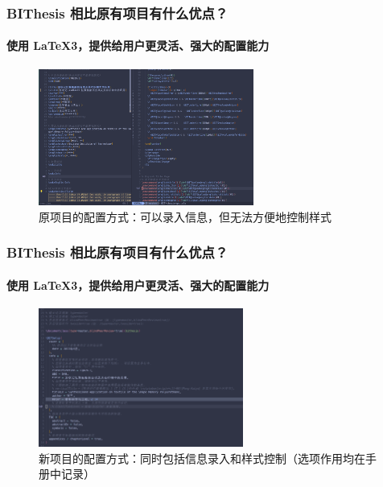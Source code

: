 \documentclass[
  aspectratio=169,
  presentation,
  titlegraphic=./images/bit.png,
  framelogo=./images/bit.png
]{bitbeamer}
\begin{document}
\begin{frame}[fragile]
  \frametitle{BIThesis 相比原有项目有什么优点？}
  \framesubtitle{使用 LaTeX3，提供给用户更灵活、强大的配置能力}

  \vspace{-0.6cm}

  \begin{figure}
    \begin{center}
      \includegraphics[width=0.63\textwidth]{images/4.png}
    \end{center}
    \caption{原项目的配置方式：可以录入信息，但无法方便地控制样式}
  \end{figure}
\end{frame}

\begin{frame}[t]
  \frametitle{BIThesis 相比原有项目有什么优点？}
  \framesubtitle{使用 LaTeX3，提供给用户更灵活、强大的配置能力}
  
  \vspace{-0.8cm}

  \begin{figure}
    \begin{center}
      \includegraphics[width=0.6\textwidth]{./images/1.png}
    \end{center}
    \caption{新项目的配置方式：同时包括信息录入和样式控制（选项作用均在手册中记录）}
  \end{figure}
  
\end{frame}
\end{document}
